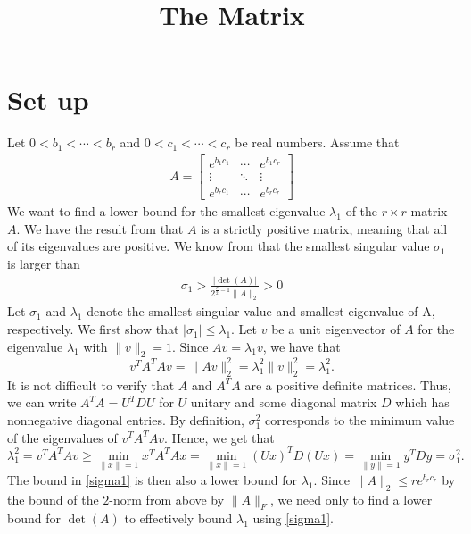 \documentclass[12pt]{amsart}
\theoremstyle{definition}
\theoremstyle{remark}
\numberwithin{equation}{section}
\begin{document}
\title{\textbf{The Matrix}}
\maketitle

\section{Set up}
Let $0<b_1<\cdots <b_r$ and $0<c_1<\cdots <c_r$ be real numbers. Assume that
\begin{align*}
A=\begin{bmatrix}
e^{b_1c_1} & \cdots & e^{b_1c_r}\\
\vdots & \ddots & \vdots \\
e^{b_rc_1} & \cdots & e^{b_rc_r}
\end{bmatrix}
\end{align*}
We want to find a lower bound for the smallest eigenvalue $\lambda_1$ of the $r \times r$ matrix  $A$. 
We have the result from \cite[Chapter 4]{pinkus} that $A$ is a strictly positive matrix, meaning that all of
its eigenvalues are positive. We know from \cite[Remark Page 4]{piazza} that the smallest singular
value $\sigma_1$ is larger than
\begin{align}\label{sigma1}
\sigma_1 > \frac{|\det(A)|}{2^{\frac{r}{2}-1}\parallel A\parallel_2}>0
\end{align}
Let $\sigma_1$ and $\lambda_1$ denote the smallest singular value and smallest eigenvalue of A, respectively.
We first show that $|\sigma_1|\leq \lambda_1$.
Let $v$ be a unit eigenvector of $A$ for the eigenvalue $\lambda_1$ with $\parallel v \parallel_2 = 1$. 
Since $Av = \lambda_1 v$, we have that 
$$v^TA^TAv=\parallel Av\parallel_2^2 = \lambda_1^2 \parallel v\parallel_2^2 = \lambda_1^2.$$
It is not difficult to verify that $A$ and $A^TA$ are a positive definite matrices. 
Thus, we can write $A^TA = U^TDU$ for $U$ unitary and some diagonal matrix $D$
which has nonnegative diagonal entries. By definition, $\sigma_1^2$ corresponds to the 
minimum value of the eigenvalues of $v^TA^TAv$. 
Hence, we get that 
$$\lambda_1^2 = v^TA^TAv \geq \min_{\parallel x\parallel =1} x^TA^TAx = \min_{\parallel x\parallel =1} (Ux)^TD(Ux) = \min_{\parallel y\parallel =1}y^TDy = \sigma_1^2.$$
The bound in \eqref{sigma1} is then also a lower bound for $\lambda_1$.
Since $\parallel A \parallel_2 \leq r e^{b_rc_r}$ by the bound of the $2$-norm from above by $\parallel A \parallel_F$,
we need only to find a lower bound for $\det(A)$ to effectively bound 
$\lambda_1$ using \eqref{sigma1}.
\end{document}
